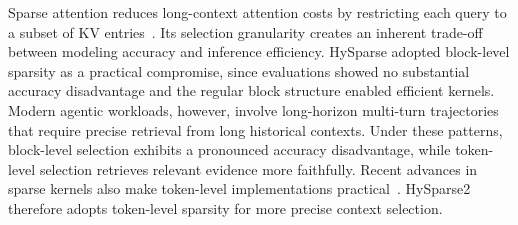 Sparse attention reduces long-context attention costs by restricting each query to a subset of KV entries~\citep{sparsetransformer}.
Its selection granularity creates an inherent trade-off between modeling accuracy and inference efficiency.
HySparse adopted block-level sparsity as a practical compromise, since evaluations showed no substantial accuracy disadvantage and the regular block structure enabled efficient kernels.
Modern agentic workloads, however, involve long-horizon multi-turn trajectories that require precise retrieval from long historical contexts.
Under these patterns, block-level selection exhibits a pronounced accuracy disadvantage, while token-level selection retrieves relevant evidence more faithfully. 
Recent advances in sparse kernels also make token-level implementations practical~\citep{tilelang}.
HySparse2 therefore adopts token-level sparsity for more precise context selection.
